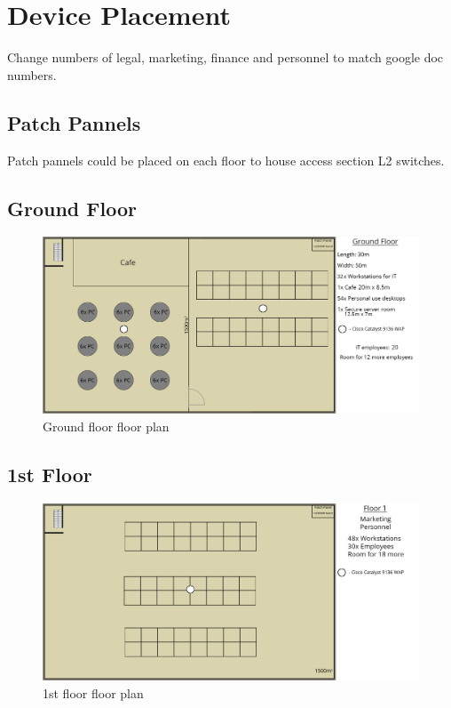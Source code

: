 \section{Device Placement}
Change numbers of legal, marketing, finance and personnel to match google doc numbers.
\subsection{Patch Pannels}
Patch pannels could be placed on each floor to house access section L2 switches.
\subsection{Ground Floor}
\begin{figure}[ht!]
    \includegraphics[width=15cm]{Figures/ground.png}
    \caption{Ground floor floor plan}
    \label{fig:ground_floor}
\end{figure}
\subsection{1st Floor}
\begin{figure}
    \includegraphics[width=15cm]{Figures/1st-floor.png}
    \caption{1st floor floor plan}
    \label{fig:1st_floor}
\end{figure}
